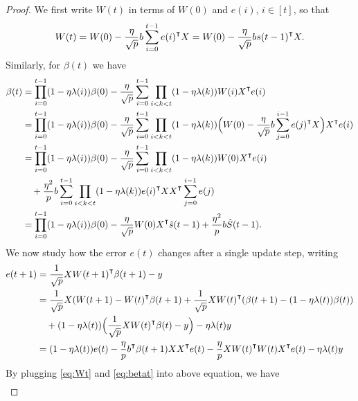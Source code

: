 \begin{proof}
We first write $W(t)$ in terms of $W(0)$ and $e(i)$, $i\in[t]$, so that
\begin{equation}
\label{eq:Wt}
    W(t) = W(0) -\frac{\eta}{\sqrt p} b\sum_{i=0}^{t-1}e(i)\transpose X = W(0) -\frac{\eta}{\sqrt p} bs(t-1)\transpose X.
\end{equation}
Similarly, for $\beta(t)$ we have
\begin{equation}
\label{eq:betat}
\begin{aligned}
    \beta(t) &=\prod_{i=0}^{t-1}(1-\eta\lambda(i))\beta(0)-\frac{\eta}{\sqrt p}\sum_{i=0}^{t-1}\prod_{i<k<t}(1-\eta\lambda(k))W(i)X\transpose e(i) \\
    &=\prod_{i=0}^{t-1}(1-\eta\lambda(i))\beta(0)-\frac{\eta}{\sqrt p}\sum_{i=0}^{t-1}\prod_{i<k<t}(1-\eta\lambda(k))\Big(W(0) -\frac{\eta}{\sqrt p} b\sum_{j=0}^{i-1}e(j)\transpose X\Big)X\transpose e(i) \\
    &=\prod_{i=0}^{t-1}(1-\eta\lambda(i))\beta(0)-\frac{\eta}{\sqrt p}\sum_{i=0}^{t-1}\prod_{i<k<t}(1-\eta\lambda(k))W(0)X\transpose e(i)\\
    &\quad + \frac{\eta^2}{p}b\sum_{i=0}^{t-1}\prod_{i<k<t}(1-\eta\lambda(k))e(i)\transpose XX\transpose \sum_{j=0}^{i-1}e(j) \\
    &=\prod_{i=0}^{t-1}(1-\eta\lambda(i))\beta(0) -\frac{\eta}{\sqrt p}W(0)X\transpose \hat{s}(t-1) +\frac{\eta^2}{p}b \hat{S}(t-1).
\end{aligned}
\end{equation}
We now study how the error $e(t)$ changes after a single update step, writing
\begin{equation*}
\begin{aligned}
    e(t+1) &= \frac{1}{\sqrt p}XW(t+1)\transpose \beta(t+1)-y \\
    &= \frac{1}{\sqrt p}X(W(t+1)-W(t)\transpose \beta(t+1)+ \frac{1}{\sqrt p}XW(t)\transpose (\beta(t+1)-(1-\eta\lambda(t))\beta(t)) \\
    &\quad +(1-\eta\lambda(t))\Big(\frac{1}{\sqrt p}XW(t)\transpose \beta(t)-y\Big) -\eta\lambda(t)y\\
    &=(1-\eta\lambda(t))e(t) - \frac{\eta}{p}b\transpose\beta(t+1)XX\transpose e(t)  - \frac{\eta}{p}XW(t)\transpose W(t)X\transpose e(t) - \eta\lambda(t)y
\end{aligned}
\end{equation*}
By plugging \eqref{eq:Wt} and \eqref{eq:betat} into above equation, we have
\begin{equation*}
\begin{aligned}

\end{aligned}
\end{equation*}
\end{proof}
